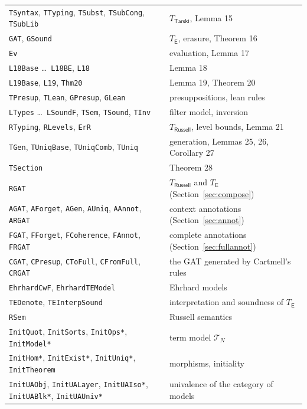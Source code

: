 \documentclass[11pt]{article}
\theoremstyle{definition}
\theoremstyle{remark}
\newcommand{\seg}[1]{\texttt{#1}}
\begin{document}
\begin{center}\small
\begin{tabular}{ll}
\seg{TSyntax}, \seg{TTyping}, \seg{TSubst}, \seg{TSubCong}, \seg{TSubLib} & $T_{\mathsf{Tarski}}$, Lemma 15\\
\seg{GAT}, \seg{GSound} & $T_{\mathsf E}$, erasure, Theorem 16\\
\seg{Ev} & evaluation, Lemma 17\\
\seg{L18Base} \dots\ \seg{L18BE}, \seg{L18} & Lemma 18\\
\seg{L19Base}, \seg{L19}, \seg{Thm20} & Lemma 19, Theorem 20\\
\seg{TPresup}, \seg{TLean}, \seg{GPresup}, \seg{GLean} & presuppositions, lean rules\\
\seg{LTypes} \dots\ \seg{LSoundF}, \seg{TSem}, \seg{TSound}, \seg{TInv} & filter model, inversion\\
\seg{RTyping}, \seg{RLevels}, \seg{ErR} & $T_{\mathsf{Russell}}$, level bounds, Lemma 21\\
\seg{TGen}, \seg{TUniqBase}, \seg{TUniqComb}, \seg{TUniq} & generation, Lemmas 25, 26, Corollary 27\\
\seg{TSection} & Theorem 28\\
\seg{RGAT} & $T_{\mathsf{Russell}}$ and $T_{\mathsf E}$ (Section~\ref{sec:compose})\\
\seg{AGAT}, \seg{AForget}, \seg{AGen}, \seg{AUniq}, \seg{AAnnot}, \seg{ARGAT} & context annotations (Section~\ref{sec:annot})\\
\seg{FGAT}, \seg{FForget}, \seg{FCoherence}, \seg{FAnnot}, \seg{FRGAT} & complete annotations (Section~\ref{sec:fullannot})\\
\seg{CGAT}, \seg{CPresup}, \seg{CToFull}, \seg{CFromFull}, \seg{CRGAT} & the GAT generated by Cartmell's rules\\
\seg{EhrhardCwF}, \seg{EhrhardTEModel} & Ehrhard models\\
\seg{TEDenote}, \seg{TEInterpSound} & interpretation and soundness of $T_{\mathsf E}$\\
\seg{RSem} & Russell semantics\\
\seg{InitQuot}, \seg{InitSorts}, \seg{InitOps*}, \seg{InitModel*} & term model $\mathcal T_N$\\
\seg{InitHom*}, \seg{InitExist*}, \seg{InitUniq*}, \seg{InitTheorem} & morphisms, initiality\\
\seg{InitUAObj}, \seg{InitUALayer}, \seg{InitUAIso*}, \seg{InitUABlk*}, \seg{InitUAUniv*} & univalence of the category of models\\

\end{tabular}
\end{center}
\end{document}
